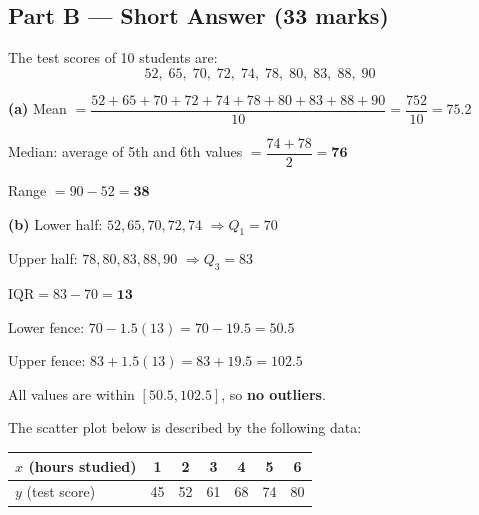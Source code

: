 \documentclass[addpoints]{exam}
\begin{document}
\begin{questions}
\section*{Part B --- Short Answer (33 marks)}

\question[6] The test scores of 10 students are:
\[52,\; 65,\; 70,\; 72,\; 74,\; 78,\; 80,\; 83,\; 88,\; 90\]
\begin{solution}[9cm]
\textbf{(a)} Mean $= \dfrac{52+65+70+72+74+78+80+83+88+90}{10} = \dfrac{752}{10} = \mathbf{75.2}$

Median: average of 5th and 6th values $= \dfrac{74+78}{2} = \mathbf{76}$

Range $= 90 - 52 = \mathbf{38}$

\textbf{(b)} Lower half: $52, 65, 70, 72, 74$ $\Rightarrow Q_1 = 70$

Upper half: $78, 80, 83, 88, 90$ $\Rightarrow Q_3 = 83$

$\text{IQR} = 83 - 70 = \mathbf{13}$

Lower fence: $70 - 1.5(13) = 70 - 19.5 = 50.5$

Upper fence: $83 + 1.5(13) = 83 + 19.5 = 102.5$

All values are within $[50.5, 102.5]$, so \textbf{no outliers}.
\end{solution}

\question[5] The scatter plot below is described by the following data:

\begin{center}
\begin{tabular}{@{}lcccccc@{}}
\toprule
$x$ (hours studied) & 1 & 2 & 3 & 4 & 5 & 6 \\
\midrule
$y$ (test score) & 45 & 52 & 61 & 68 & 74 & 80 \\
\bottomrule
\end{tabular}
\end{center}
\end{questions}
\end{document}
